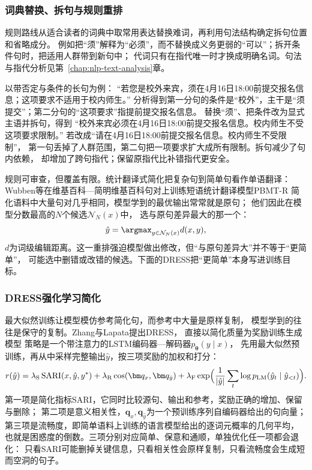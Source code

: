 \subsubsection{词典替换、拆句与规则重排}
\label{sec:nlp-generation-rule-simplification}

规则路线从适合读者的词典中取常用表达替换难词，再利用句法结构确定拆句位置和省略成分。
例如把“须”解释为“必须”，而不替换成义务更弱的“可以”；拆开条件句时，把适用人群带到新句中；
代词只有在指代唯一时才换成明确名词。句法与指代分析见第~\ref{chap:nlp-text-analysis}章。

以带否定与条件的长句为例：
“若您是校外来宾，须在4月16日18:00前提交报名信息；这项要求不适用于校内师生。”
分析得到第一分句的条件是“校外”，主干是“须提交”；第二分句的“这项要求”指提前提交报名信息。
替换“须”、把条件改为显式主语并拆句，得到
“校外来宾必须在4月16日18:00前提交报名信息。校内师生不受这项要求限制。”
若改成“请在4月16日18:00前提交报名信息。校内师生不受限制”，
第一句丢掉了人群范围，第二句把一项要求扩大成所有限制。拆句减少了句内依赖，
却增加了跨句指代；保留原指代比补错指代更安全。

规则可审查，但覆盖有限。统计翻译式简化把复杂句到简单句看作单语翻译：
Wubben等在维基百科—简明维基百科句对上训练短语统计翻译模型PBMT-R
简化语料中大量句对几乎相同，模型学到的最优输出常常就是原句；
他们因此在模型分数最高的$N$个候选$\mathcal{N}_N(x)$中，
选与原句差异最大的那一个：
\begin{equation}
  \hat y=\argmax_{y\in\mathcal{N}_N(x)}d(x,y),
  \label{eq:nlp-generation-pbmtr}
\end{equation}
$d$为词级编辑距离。这一重排强迫模型做出修改，但“与原句差异大”并不等于“更简单”，
可能选中删错或改错的候选。下面的DRESS把“更简单”本身写进训练目标。

\subsubsection{DRESS强化学习简化}
\label{sec:nlp-generation-dress}

最大似然训练让模型模仿参考简化句，而参考中大量是原样复制，
模型学到的往往是保守的复制。Zhang与Lapata提出DRESS，
直接以简化质量为奖励训练生成模型
策略是一个带注意力的LSTM编码器—解码器$p_{\bm\theta}(y\mid x)$，
先用最大似然预训练，再从中采样完整输出$\hat y$，按三项奖励的加权和打分：
\begin{equation}
  r(\hat y)=\lambda_{\mathrm{S}}\operatorname{SARI}(x,\hat y,y^{\ast})
  +\lambda_{\mathrm{R}}\cos(\bm q_x,\bm q_{\hat y})
  +\lambda_{\mathrm{F}}\exp\Bigl(\frac{1}{|\hat y|}\sum_{t}\log p_{\mathrm{LM}}(\hat y_t\mid\hat y_{<t})\Bigr).
  \label{eq:nlp-generation-dress-reward}
\end{equation}
第一项是简化指标SARI，它同时比较源句、输出和参考，奖励正确的增加、保留与删除；
第二项是意义相关性，$\bm q_x,\bm q_{\hat y}$为一个预训练序列自编码器给出的句向量；
第三项是流畅度，即简单语料上训练的语言模型给出的逐词元概率的几何平均，
也就是困惑度的倒数。三项分别对应简单、保意和通顺，单独优化任一项都会退化：
只看SARI可能删掉关键信息，只看相关性会原样复制，只看流畅度会生成短而空洞的句子。

